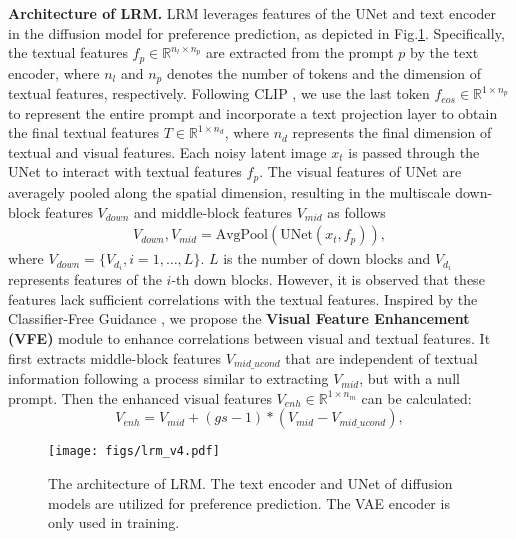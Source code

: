 \textbf{Architecture of LRM.} LRM leverages features of the UNet and text encoder in the diffusion model for preference prediction, as depicted in Fig.\;\ref{fig:lrm}. 
Specifically, the textual features $f_p\in\mathbb{R}^{n_l\times n_p}$ are extracted from the prompt $p$ by the text encoder, where $n_l$ and $n_p$ denotes the number of tokens and the dimension of textual features, respectively. Following CLIP \cite{clip}, we use the last token $f_{eos}\in\mathbb{R}^{1\times n_p}$ to represent the entire prompt and incorporate a text projection layer to obtain the final textual features $T\in\mathbb{R}^{1\times n_d}$, where $n_d$ represents the final dimension of textual and visual features. Each noisy latent image $x_t$ is passed through the UNet to interact with textual features $f_p$. The visual features of UNet are averagely pooled along the spatial dimension, resulting in the multiscale down-block features $V_{down}$ and middle-block features $V_{mid}$ as follows
\begin{gather}
    V_{down},V_{mid}=\text{AvgPool}(\text{UNet}(x_t,f_p)), 
\end{gather}
where $V_{down}=\{V_{d_i},i=1,\ldots,L\}$. $L$ is the number of down blocks and $V_{d_i}$ represents features of the $i$-th down blocks. However, it is observed that these features lack sufficient correlations with the textual features. Inspired by the Classifier-Free Guidance \cite{cfg}, we propose the \textbf{Visual Feature Enhancement (VFE)} module to enhance correlations between visual and textual features. It first extracts middle-block features $V_{mid\_ucond}$ that are independent of textual information following a process similar to extracting $V_{mid}$, but with a null prompt. Then the enhanced visual features $V_{enh}\in\mathbb{R}^{1\times n_m}$ can be calculated:
\begin{equation}
    V_{enh}=V_{mid}+(gs-1)*(V_{mid}-V_{mid\_ucond}),
    \label{eq:cfg}
\end{equation}
\begin{figure}[t]
    \centering
    \texttt{[image: figs/lrm\_v4.pdf]}
    \vspace{-24pt}
    \caption{The architecture of LRM. The text encoder and UNet of diffusion models are utilized for preference prediction. The VAE encoder is only used in training.}
    \label{fig:lrm}
    \vspace{-14pt}
\end{figure}
